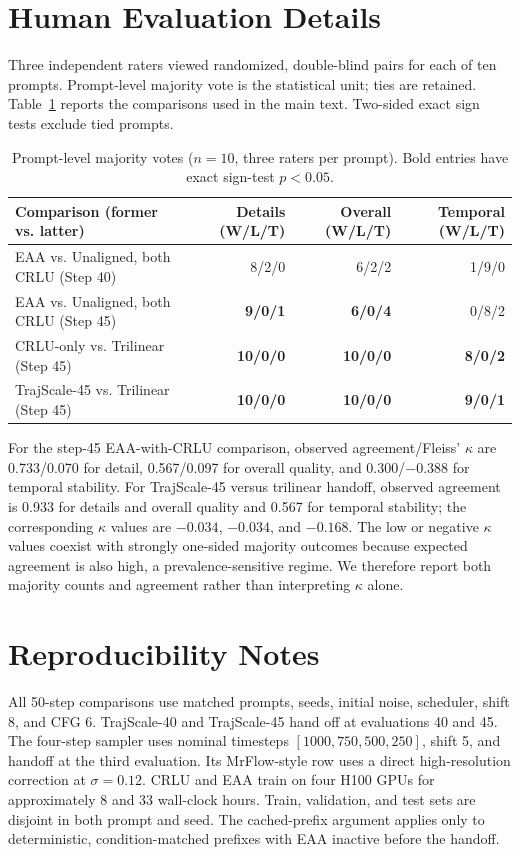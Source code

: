 \documentclass[letterpaper]{article}
\begin{document}
\section{Human Evaluation Details}

Three independent raters viewed randomized, double-blind pairs for each of ten prompts. Prompt-level majority vote is the statistical unit; ties are retained. Table~\ref{tab:s_human} reports the comparisons used in the main text. Two-sided exact sign tests exclude tied prompts.

\begin{table}[t]
\centering
\small
\begin{tabular}{lrrr}
\toprule
Comparison (former vs. latter) & Details (W/L/T) & Overall (W/L/T) & Temporal (W/L/T) \\
\midrule
EAA vs. Unaligned, both CRLU (Step 40) & 8/2/0 & 6/2/2 & 1/9/0 \\
EAA vs. Unaligned, both CRLU (Step 45) & \textbf{9/0/1} & \textbf{6/0/4} & 0/8/2 \\
CRLU-only vs. Trilinear (Step 45) & \textbf{10/0/0} & \textbf{10/0/0} & \textbf{8/0/2} \\
TrajScale-45 vs. Trilinear (Step 45) & \textbf{10/0/0} & \textbf{10/0/0} & \textbf{9/0/1} \\
\bottomrule
\end{tabular}
\caption{Prompt-level majority votes ($n=10$, three raters per prompt). Bold entries have exact sign-test $p<0.05$.}
\label{tab:s_human}
\end{table}

For the step-45 EAA-with-CRLU comparison, observed agreement/Fleiss' $\kappa$ are 0.733/0.070 for detail, 0.567/0.097 for overall quality, and 0.300/$-0.388$ for temporal stability. For TrajScale-45 versus trilinear handoff, observed agreement is 0.933 for details and overall quality and 0.567 for temporal stability; the corresponding $\kappa$ values are $-0.034$, $-0.034$, and $-0.168$. The low or negative $\kappa$ values coexist with strongly one-sided majority outcomes because expected agreement is also high, a prevalence-sensitive regime. We therefore report both majority counts and agreement rather than interpreting $\kappa$ alone.

\section{Reproducibility Notes}

All 50-step comparisons use matched prompts, seeds, initial noise, scheduler, shift 8, and CFG 6. TrajScale-40 and TrajScale-45 hand off at evaluations 40 and 45. The four-step sampler uses nominal timesteps $[1000,750,500,250]$, shift 5, and handoff at the third evaluation. Its MrFlow-style row uses a direct high-resolution correction at $\sigma=0.12$. CRLU and EAA train on four H100 GPUs for approximately 8 and 33 wall-clock hours. Train, validation, and test sets are disjoint in both prompt and seed. The cached-prefix argument applies only to deterministic, condition-matched prefixes with EAA inactive before the handoff.
\end{document}
